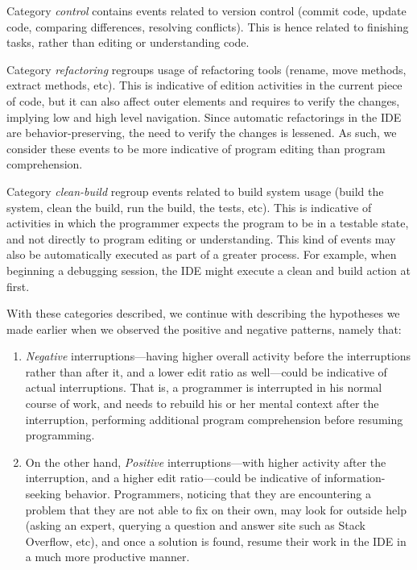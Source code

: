 \documentclass[times]{smrauth}
\newcommand\RR[1]{\textbf{Romain #1}}
\begin{document}
Category \emph{control} contains events related to version control (commit code, update code, comparing differences, resolving conflicts). This is hence related to finishing tasks, rather than editing or understanding code. 

Category \emph{refactoring} regroups usage of refactoring tools (rename, move methods, extract methods, etc). This is indicative of edition activities in the current piece of code, but it can also affect outer elements and requires to verify the changes, implying low and high level navigation. Since automatic refactorings in the IDE are behavior-preserving, the need to verify the changes is lessened. As such, we consider these events to be more indicative of program editing than program comprehension.

Category \emph{clean-build} regroup events related to build system usage (build the system, clean the build, run the build, the tests, etc). This is indicative of activities in which the programmer expects the program to be in a testable state, and not directly to program editing or understanding. This kind of events may also be automatically executed as part of a greater process. For example, when beginning a debugging session, the IDE might execute a clean and build action at first. 


With these categories described, we continue with describing the hypotheses we made earlier when we observed the positive and negative patterns, namely that:

\begin{enumerate}
\item \emph{Negative} interruptions---having higher overall activity before the interruptions rather than after it, and a lower edit ratio as well---could be indicative of actual interruptions. That is, a programmer is interrupted in his normal course of work, and needs to rebuild his or her mental context after the interruption, performing additional program comprehension before resuming programming.
\item On the other hand, \emph{Positive} interruptions---with higher activity after the interruption, and a higher edit ratio---could be indicative of information-seeking behavior. Programmers, noticing that they are encountering a problem that they are not able to fix on their own, may look for outside help (asking an expert, querying a question and answer site such as Stack Overflow, etc), and once a solution is found, resume their work in the IDE in a much more productive manner.
\end{enumerate}
\end{document}
